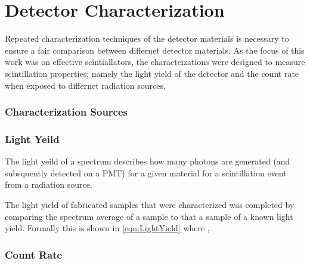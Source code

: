 \chapter{Detector Characterization}
\label{chap:DetChar}
Repeated characterization techniques of the detector materials is necessary to ensure a fair comparison between differnet detector materials.
As the focus of this work was on effective scintiallators, the characteizations were designed to measure scintillation properties; namely the light yield of the detector and the count rate when exposed to differnet radiation sources.

\subsection{Characterization Sources}

\subsection{Light Yeild}
The light yeild of a spectrum describes how many photons are generated (and subsquently detected on a PMT) for a given material for a scintillation event from a radiation source.

The light yield of fabricated samples that were characterized was completed by comparing the spectrum average of a sample to that a sample of a known light yield.
Formally this is shown in \eqref{eqn:LightYield} where , 

\subsection{Count Rate}
